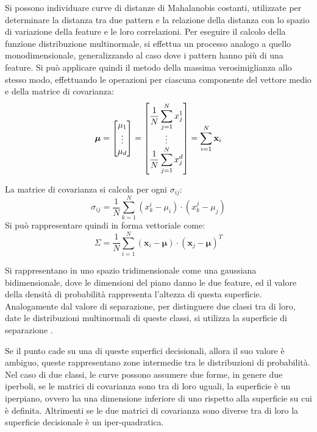 \documentclass{article}
\numberwithin{equation}{subsection}
\newcommand{\vect}[1]{\boldsymbol{\mathbf{#1}}}
\begin{document}
Si possono individuare curve di distanze di Mahalanobis costanti, utilizzate per determinare la distanza tra due pattern e la relazione della distanza con lo spazio di variazione della feature e le loro correlazioni. 
Per eseguire il calcolo della funzione distribuzione multinormale, si effettua un processo analogo a quello monodimensionale, generalizzando al caso dove i pattern hanno più di una feature. 
Si può applicare quindi il metodo della massima verosimiglianza allo stesso modo, effettuando le operazioni per ciascuna componente del vettore medio e della matrice di covarianza:
\begin{equation}
    \vect{\mu}=\begin{bmatrix}
        \strut\mu_1\\\vdots\\\strut\mu_d
    \end{bmatrix}=\begin{bmatrix}
        \displaystyle\frac{1}{N}\sum_{j=1}^Nx_j^1\\\vdots\\
        \displaystyle\frac{1}{N}\sum_{j=1}^Nx_j^d
    \end{bmatrix}=\displaystyle\sum_{i=1}^N\vect{x}_i
\end{equation}

La matrice di covarianza si calcola per ogni $\sigma_{ij}$:
\begin{equation*}
    \sigma_{ij}=\displaystyle\frac{1}{N}\sum_{k=1}^N(x_k^i-\mu_i)\cdot(x_k^j-\mu_j)
\end{equation*}
Si può rappresentare quindi in forma vettoriale come:
\begin{equation}
    \Sigma=\displaystyle\frac{1}{N}\sum_{i=1}^N(\vect{x}_i-\vect{\mu})\cdot(\vect{x}_j-\vect{\mu})^T
\end{equation}


Si rappresentano in uno spazio tridimensionale come una gaussiana bidimensionale, dove 
le dimensioni del piano danno le due feature, ed il valore della densità di probabilità rappresenta l'altezza di questa superficie. 
Analogamente dal valore di separazione, per distinguere due classi tra di loro, date le distribuzioni multinormali di queste classi, si utilizza la superficie di separazione . 


Se il punto cade su una di queste superfici decisionali, allora il suo valore è ambiguo, queste rappresentano zone intermedie tra le distribuzioni di probabilità. 
Nel caso di due classi, le curve possono assumere due forme, in genere due iperboli, se le matrici di covarianza sono tra di loro uguali, la superficie è un iperpiano, ovvero ha una dimensione inferiore di uno rispetto alla superficie su cui è definita. Altrimenti se le due matrici di covarianza sono diverse tra di loro la superficie decisionale è un iper-quadratica. 
\end{document}
